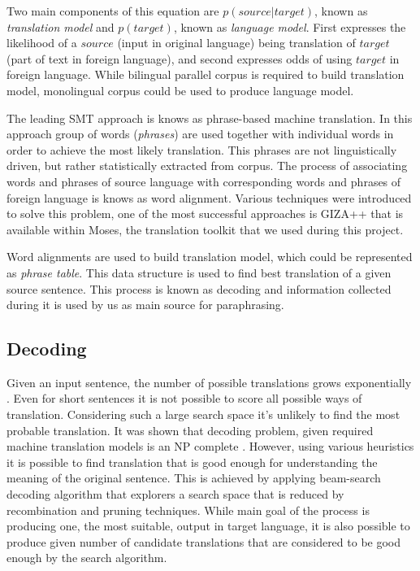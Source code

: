 Two main components of this equation are $p(source|target)$, known as \textit{translation model} and $p(target)$, known as \textit{language model}. First expresses the likelihood of a $source$ (input in original language) being translation of $target$ (part of text in foreign language), and second expresses odds of using $target$ in foreign language. While bilingual parallel corpus is required to build translation model, monolingual corpus could be used to produce language model. 

The leading SMT approach is knows as phrase-based machine translation. In this approach group of words (\textit{phrases}) are used together with individual words in order to achieve the most likely translation. This phrases are not linguistically driven, but rather statistically extracted from corpus. The process of associating words and phrases of source language with corresponding words and phrases of foreign language is knows as word alignment. Various techniques were introduced to solve this problem, one of the most successful approaches is GIZA++ that is available within Moses, the translation toolkit that we used during this project.

Word alignments are used to build translation model, which could be represented as \textit{phrase table}. This data structure is used to find best translation of a given source sentence. This process is known as decoding and information collected during it is used by us as main source for paraphrasing.

\subsection{Decoding}

Given an input sentence, the number of possible translations grows exponentially \citep{Koehn2009a}. Even for short sentences it is not possible to score all possible ways of translation. Considering such a large search space it's unlikely to find the most probable translation. It was shown that decoding problem, given required machine translation models is an NP complete \citep{knight1999decoding}. However, using various heuristics it is possible to find translation that is good enough for understanding the meaning of the original sentence. This is achieved by applying beam-search decoding algorithm that explorers a search space that is reduced by recombination and pruning techniques. While main goal of the process is producing one, the most suitable, output in target language, it is also possible to produce given number of candidate translations that are considered to be good enough by the search algorithm.

